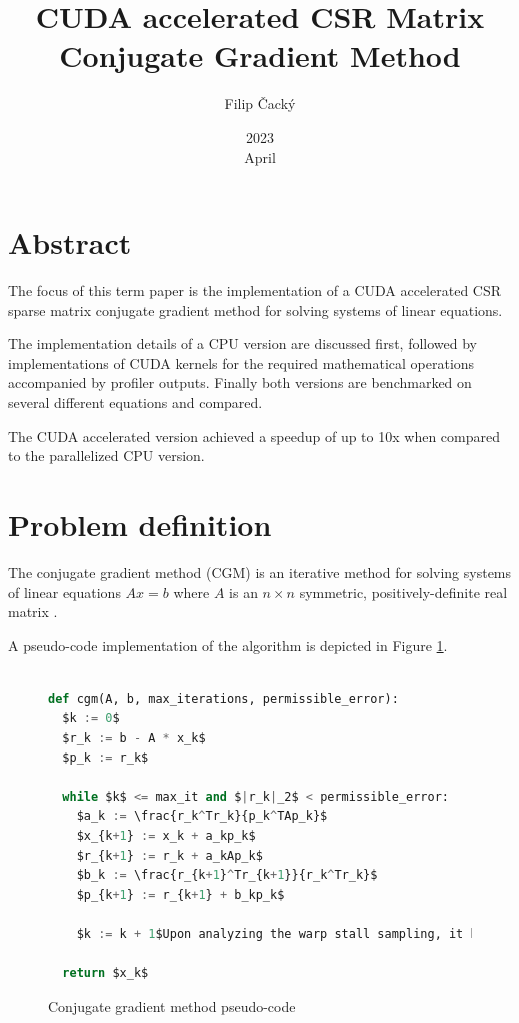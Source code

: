 \documentclass{article}
\title{CUDA accelerated CSR Matrix Conjugate Gradient Method}
\author{Filip Čacký}
\date{2023\\ April}
\begin{document}
\maketitle

\section{Abstract}
The focus of this term paper is the implementation of a CUDA accelerated CSR sparse matrix
conjugate gradient method for solving systems of linear equations.

The implementation details of a CPU version are discussed first,
followed by implementations of CUDA kernels for the required mathematical operations
accompanied by profiler outputs.
Finally both versions are benchmarked on several different equations and compared.

The CUDA accelerated version achieved a speedup of up to 10x when compared to the parallelized CPU version.

\section{Problem definition}
The conjugate gradient method (CGM) is an iterative method for solving systems of linear equations $Ax = b$
where $A$ is an $n\times n$ symmetric, positively-definite real matrix \cite{wiki_cgm}.

A pseudo-code implementation of the algorithm is depicted in Figure \ref{code:cgm_pseudo}.

\begin{figure}[H]
\begin{lstlisting}[language=Python,mathescape=true]

def cgm(A, b, max_iterations, permissible_error):
  $k := 0$
  $r_k := b - A * x_k$
  $p_k := r_k$

  while $k$ <= max_it and $|r_k|_2$ < permissible_error: 
    $a_k := \frac{r_k^Tr_k}{p_k^TAp_k}$
    $x_{k+1} := x_k + a_kp_k$
    $r_{k+1} := r_k + a_kAp_k$
    $b_k := \frac{r_{k+1}^Tr_{k+1}}{r_k^Tr_k}$
    $p_{k+1} := r_{k+1} + b_kp_k$

    $k := k + 1$Upon analyzing the warp stall sampling, it becomes evident that the majority of time spent within the kernel is attributed to global memory access, which proves to be challenging to optimize due to the inherent characteristics of the algorithm.

  return $x_k$

\end{lstlisting}
\caption{Conjugate gradient method pseudo-code \cite{wiki_cgm}}
\label{code:cgm_pseudo}
\end{figure}
\end{document}
